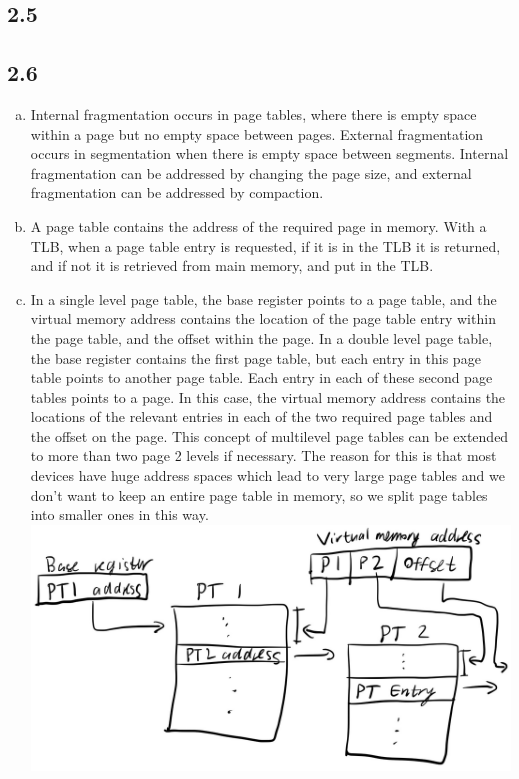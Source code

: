 \documentclass[12pt]{article}
\begin{document}
\subsection*{2.5}



\subsection*{2.6}

\begin{enumerate}[(a)]
    \item Internal fragmentation occurs in page tables, where there is empty space within a page but no empty space between pages. External fragmentation occurs in segmentation when there is empty space between segments. Internal fragmentation can be addressed by changing the page size, and external fragmentation can be addressed by compaction.
    \item A page table contains the address of the required page in memory. With a TLB, when a page table entry is requested, if it is in the TLB it is returned, and if not it is retrieved from main memory, and put in the TLB.
    \item In a single level page table, the base register points to a page table, and the virtual memory address contains the location of the page table entry within the page table, and the offset within the page. In a double level page table, the base register contains the first page table, but each entry in this page table points to another page table. Each entry in each of these second page tables points to a page. In this case, the virtual memory address contains the locations of the relevant entries in each of the two required page tables and the offset on the page. This concept of multilevel page tables can be extended to more than two page 2 levels if necessary. The reason for this is that most devices have huge address spaces which lead to very large page tables and we don't want to keep an entire page table in memory, so we split page tables into smaller ones in this way.\\
    \includegraphics[scale=0.25]{2.6c.jpg}
\end{enumerate}
\end{document}
